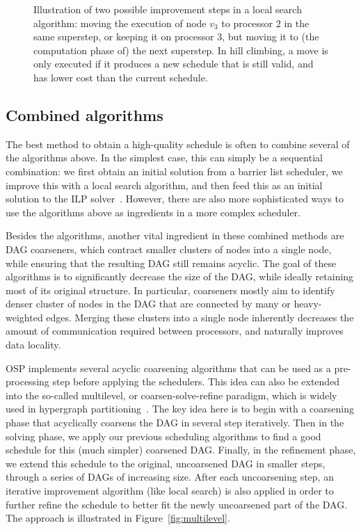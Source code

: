 \documentclass[oneside,reqno, a4paper]{amsart}
\numberwithin{equation}{section}
\begin{document}
\begin{figure}
	\centering
	\resizebox{0.55\textwidth}{!}{}
	\caption{Illustration of two possible improvement steps in a local search algorithm: moving the execution of node $v_3$ to processor $2$ in the same superstep, or keeping it on processor $3$, but moving it to (the computation phase of) the next superstep. In hill climbing, a move is only executed if it produces a new schedule that is still valid, and has lower cost than the current schedule.}
	\label{fig:hc}
\end{figure}

\subsection{Combined algorithms}

The best method to obtain a high-quality schedule is often to combine several of the algorithms above. In the simplest case, this can simply be a sequential combination: we first obtain an initial solution from a barrier list scheduler, we improve this with a local search algorithm, and then feed this as an initial solution to the ILP solver~\cite{BSP_algos_opdas}. However, there are also more sophisticated ways to use the algorithms above as ingredients in a more complex scheduler.

Besides the algorithms, another vital ingredient in these combined methods are DAG coarseners, which contract smaller clusters of nodes into a single node, while ensuring that the resulting DAG still remains acyclic. The goal of these algorithms is to significantly decrease the size of the DAG, while ideally retaining most of its original structure. In particular, coarseners mostly aim to identify denser cluster of nodes in the DAG that are connected by many or heavy-weighted edges. Merging these clusters into a single node inherently decreases the amount of communication required between processors, and naturally improves data locality.

OSP implements several acyclic coarsening algorithms that can be used as a pre-processing step before applying the schedulers. This idea can also be extended into the so-called multilevel, or coarsen-solve-refine paradigm, which is widely used in hypergraph partitioning~\cite{hMetis,Popp21multilevel}. The key idea here is to begin with a coarsening phase that acyclically coarsens the DAG in several step iteratively. Then in the solving phase, we apply our previous scheduling algorithms to find a good schedule for this (much simpler) coarsened DAG. Finally, in the refinement phase, we extend this schedule to the original, uncoarsened DAG in smaller steps, through a series of DAGs of increasing size. After each uncoarsening step, an iterative improvement algorithm (like local search) is also applied in order to further refine the schedule to better fit the newly uncoarsened part of the DAG. The approach is illustrated in Figure~\ref{fig:multilevel}.
\end{document}
